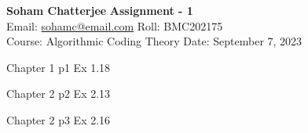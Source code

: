 \documentclass[a4paper, 11pt]{article}
\begin{document}

\textsf{\noindent \large\textbf{Soham Chatterjee} \hfill \textbf{Assignment - 1}\\
    Email: \href{sohamc@cmi.ac.in}{sohamc@email.com} \hfill Roll: BMC202175\\
    \normalsize Course: Algorithmic Coding Theory \hfill Date: September 7, 2023}


\begin{problem}{%
		Chapter 1
}{p1
}
Ex 1.18
\end{problem}

\solve{
}



\begin{problem}{%
		Chapter 2
}{p2%
}
Ex 2.13		

\end{problem}

\solve{
}

\begin{problem}{%
		Chapter 2
	}{p3%
	}
	Ex 2.16
\end{problem}
\end{document}
